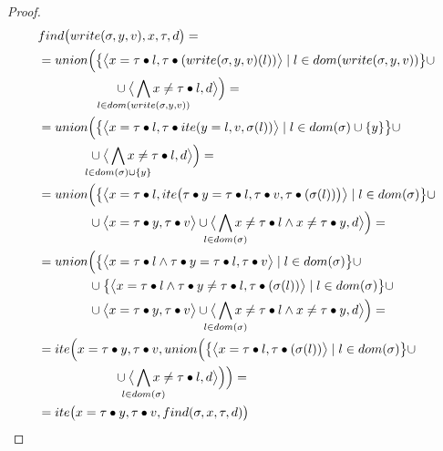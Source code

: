 \findwritelemma*
\begin{proof}
\begin{align*}
&\finD{\mutate{\sigma}{y}{v}}{x}{\tau}{d}=\\
&=\cmpbody{x}{\mutate{\sigma}{y}{v}}{\tau}{d}=\\
&=\Union{\big\{\paiR{\mg{x}{\fillterm{\tau}{l}}}{\fillterm{\tau}{\ite{\mg{y}{l}}{v}{\sigma(l)}}} \mid l\in\dom{\sigma}\cup\{y\} \big\}\cup\\
    &\qquad\qquad\cup\paiR{\bigwedge_{\mathclap{l\in\dom{\sigma}\cup\{y\}}}{\nmg{x}{\fillterm{\tau}{l}}}}{d}}=\\
&=\Union{\big\{\paiR{\mg{x}{\fillterm{\tau}{l}}}{\Ite{\mg{\fillterm{\tau}{y}}{\fillterm{\tau}{l}}}{\fillterm{\tau}{v}}{\fillterm{\tau}{(\sigma(l))}}} \mid l\in\dom{\sigma} \big\}\cup\\
	&\qquad\qquad\cup\paiR{\mg{x}{\fillterm{\tau}{y}}}{\fillterm{\tau}{v}}\cup\paiR{\bigwedge_{\mathclap{l\in\dom{\sigma}}}{\nmg{x}{\fillterm{\tau}{l}}}\wedge\nmg{x}{\fillterm{\tau}{y}}}{d}}=\\
&=\Union{\big\{\paiR{\mg{x}{\fillterm{\tau}{l}}\wedge\mg{\fillterm{\tau}{y}}{\fillterm{\tau}{l}}}{\fillterm{\tau}{v}} \mid l\in\dom{\sigma} \big\}\cup\\
    &\qquad\qquad\cup\big\{\paiR{\mg{x}{\fillterm{\tau}{l}}\wedge\nmg{\fillterm{\tau}{y}}{\fillterm{\tau}{l}}}{\fillterm{\tau}{(\sigma(l))}} \mid l\in\dom{\sigma} \big\}\cup\\
	&\qquad\qquad\cup\paiR{\mg{x}{\fillterm{\tau}{y}}}{\fillterm{\tau}{v}}\cup\paiR{\bigwedge_{\mathclap{l\in\dom{\sigma}}}{\nmg{x}{\fillterm{\tau}{l}}}\wedge\nmg{x}{\fillterm{\tau}{y}}}{d}}=\\
&=\ITE{\mg{x}{\fillterm{\tau}{y}}}{\fillterm{\tau}{v}}{\cmpbody{x}{\sigma}{\tau}{d}}=\\
&=\Ite{\mg{x}{\fillterm{\tau}{y}}}{\fillterm{\tau}{v}}{\find{\sigma}{x}{\tau}{d}}
\end{align*}
\end{proof}
